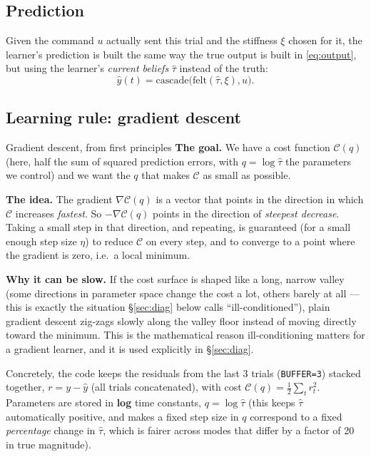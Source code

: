 \documentclass[11pt,a4paper]{article}
\begin{document}
\subsection{Prediction}

Given the command $u$ actually sent this trial and the stiffness $\xi$ chosen
for it, the learner's prediction is built the same way the true output is
built in \eqref{eq:output}, but using the learner's \emph{current beliefs}
$\hat\tau$ instead of the truth:
\begin{equation}
\hat y(t) = \text{cascade}\bigl(\text{felt}(\hat\tau,\xi), u\bigr).
\label{eq:pred1}
\end{equation}

\subsection{Learning rule: gradient descent}

\begin{techbox}{Gradient descent, from first principles}
\textbf{The goal.} We have a cost function $\mathcal C(q)$ (here, half the sum
of squared prediction errors, with $q=\log\hat\tau$ the parameters we control)
and we want the $q$ that makes $\mathcal C$ as small as possible.

\textbf{The idea.} The gradient $\nabla\mathcal C(q)$ is a vector that points
in the direction in which $\mathcal C$ increases \emph{fastest}. So $-\nabla
\mathcal C(q)$ points in the direction of \emph{steepest decrease}. Taking a
small step in that direction, and repeating, is guaranteed (for a small enough
step size $\eta$) to reduce $\mathcal C$ on every step, and to converge to a
point where the gradient is zero, i.e.\ a local minimum.

\textbf{Why it can be slow.} If the cost surface is shaped like a long, narrow
valley (some directions in parameter space change the cost a lot, others
barely at all --- this is exactly the situation \S\ref{sec:diag} below calls
``ill-conditioned''), plain gradient descent zig-zags slowly along the valley
floor instead of moving directly toward the minimum. This is the mathematical
reason ill-conditioning matters for a gradient learner, and it is used
explicitly in \S\ref{sec:diag}.
\end{techbox}

Concretely, the code keeps the residuals from the last 3 trials
(\texttt{BUFFER=3}) stacked together, $r=y-\hat y$ (all trials concatenated),
with cost $\mathcal C(q)=\tfrac12\sum_t r_t^2$. Parameters are stored in
\textbf{log} time constants, $q=\log\hat\tau$ (this keeps $\hat\tau$
automatically positive, and makes a fixed step size in $q$ correspond to a
fixed \emph{percentage} change in $\hat\tau$, which is fairer across modes
that differ by a factor of 20 in true magnitude).
\end{document}
